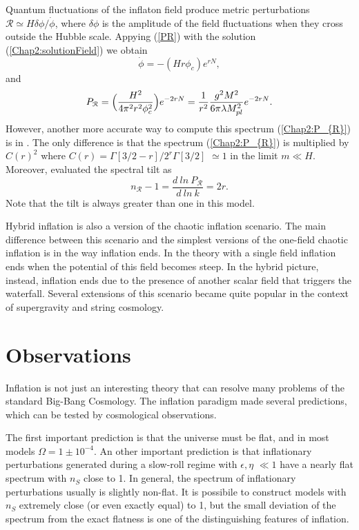 \documentclass[11pt,a4paper,twoside]{book}
\begin{document}
Quantum fluctuations of the inflaton field produce metric perturbations $ \mathcal{R} \simeq H\delta\phi/\dot{\phi} $, where $\delta \phi$ is the amplitude of the field fluctuations when they cross outside the Hubble scale.
Appying (\ref{PR}) with the solution (\ref{Chap2:solutionField}) we obtain
\begin{equation}
\dot{\phi}=-(Hr\phi_{c})e^{rN},	
\end{equation}
and 
\begin{equation}
	\label{Chap2:P_{R}}
	P_{\mathcal{R}}=\Big (\frac{H^{2}}{4\pi^{2}r^{2}\phi_{c}^{2}}\Big)e^{-2rN} = \frac{1}{r^{2}}\frac{g^{2}M^{2}}{6\pi\lambda M_{pl}^{2}}e^{-2rN}.
\end{equation}
However, another more accurate way to compute this spectrum (\ref{Chap2:P_{R}}) is in \cite{Chap2:PerturbationsHybridInflation}. The only difference is that the spectrum (\ref{Chap2:P_{R}}) is multiplied by $ C(r)^{2} $ where $ C(r)=\Gamma[3/2-r]/2^{r}\Gamma[3/2] $ $\simeq 1$ in the limit $ m\ll H $.
Moreover, \cite{Chap2:PerturbationsHybridInflation} evaluated the spectral tilt as
\begin{equation}
	n_{\mathcal{R}} - 1 = \frac{d\ ln\ P_{\mathcal{R}}}{d\ ln\ k} = 2r. 
\end{equation}
Note that the tilt is always greater than one in this model.

Hybrid inflation is also a version of the chaotic inflation scenario. The main difference between this scenario and the simplest versions of the one-field chaotic inflation is in the way inflation ends. In the theory with  a single field inflation ends when the potential of this field becomes steep. In the hybrid picture, instead, inflation ends due to the presence of another scalar field that triggers the waterfall.
Several extensions of this scenario became quite popular in the context of supergravity and string cosmology.

\section{Observations}
Inflation is not just an interesting theory  that can resolve many problems of the standard Big-Bang Cosmology. The inflation paradigm made several predictions, which can be tested by cosmological observations.

The first important prediction is that the universe must be flat, and in most models $ \Omega = 1 \pm 10^{-4} $.
 An other important prediction is that  inflationary perturbations generated during a slow-roll regime with $\epsilon,\eta$ $\ll 1$ have a nearly flat spectrum with $ n_{S}$ close to 1. In general, the spectrum of inflationary perturbations usually is slightly non-flat. It is possibile to construct models with $ n_{S}$ extremely close (or even exactly equal) to 1, but the small deviation of the spectrum from the exact flatness is one of the distinguishing features of inflation.
 
\end{document}
